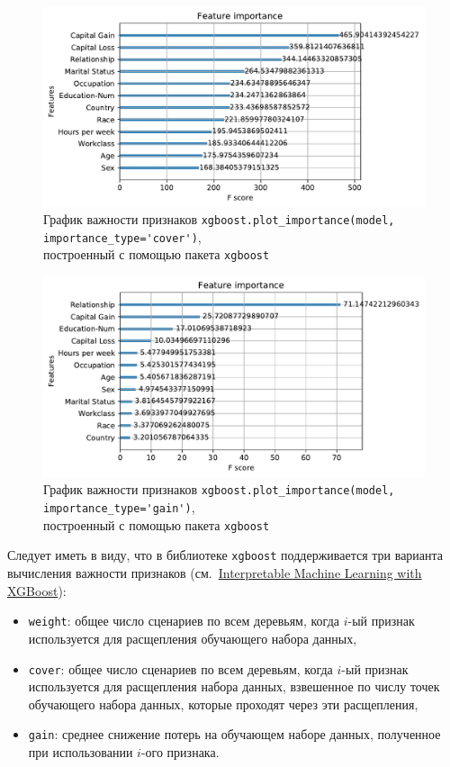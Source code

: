 \documentclass[%
	11pt,
	a4paper,
	utf8,
		]{article}
\begin{document}
\begin{figure}[h]
	\centering
	\includegraphics[scale=0.75]{figures/xgboost_plot_cover.pdf}
	\caption{График важности признаков \lstinline{xgboost.plot_importance(model, importance_type='cover')},\\построенный с помощью пакета \texttt{xgboost} }\label{fig:xgboost_plot_cover}
\end{figure}

\begin{figure}[h]
	\centering
	\includegraphics[scale=0.75]{figures/xgboost_plot_gain.pdf}
	\caption{График важности признаков \lstinline{xgboost.plot_importance(model, importance_type='gain')},\\построенный с помощью пакета \texttt{xgboost} }\label{fig:xgboost_plot_gain}
\end{figure}

Следует иметь в виду, что в библиотеке \texttt{xgboost} поддерживается три варианта вычисления важности признаков (см.~\href{https://towardsdatascience.com/interpretable-machine-learning-with-xgboost-9ec80d148d27}{Interpretable Machine Learning with XGBoost}):

\begin{itemize}
	\item \texttt{weight}: общее число сценариев по всем деревьям, когда $i$-ый признак используется для расщепления обучающего набора данных,
	
	\item \texttt{cover}: общее число сценариев по всем деревьям, когда $i$-ый признак используется для расщепления набора данных, взвешенное по числу точек обучающего набора данных, которые проходят через эти расщепления,
	
	\item \texttt{gain}: среднее снижение потерь на обучающем наборе данных, полученное при использовании $i$-ого признака.
\end{itemize}
\end{document}
